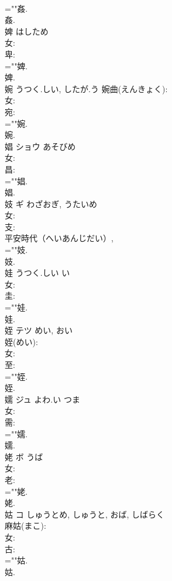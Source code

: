 \documentclass[8pt]{extreport}
\begin{document}
\begin{CJK}{UTF8}{min}
\\	=""姦.
\\	姦.
\\	婢		はしため				
\\	女: 
\\	卑: 
\\	=""婢.
\\	婢.
\\	婉		うつく.しい, したが.う			婉曲(えんきょく): 
\\	女: 
\\	宛: 
\\	=""婉.
\\	婉.
\\	娼	ショウ	あそびめ		
\\	女: 
\\	昌: 
\\	=""娼.
\\	娼.
\\	妓	ギ	わざおぎ, うたいめ		
\\	女: 
\\	支: 
\\	平安時代（へいあんじだい）, 
\\	=""妓.
\\	妓.
\\	娃		うつく.しい	い			
\\	女: 
\\	圭: 
\\	=""娃.
\\	娃.
\\	姪	テツ	めい, おい		
\\	姪(めい): 
\\	女: 
\\	至: 
\\	=""姪.
\\	姪.
\\	嬬	ジュ	よわ.い	つま	
\\	女: 
\\	需: 
\\	=""嬬.
\\	嬬.
\\	姥	ボ	うば		
\\	女: 
\\	老: 
\\	=""姥.
\\	姥.
\\	姑	コ	しゅうとめ, しゅうと, おば, しばらく		
\\	麻姑(まこ): 
\\	女: 
\\	古: 
\\	=""姑.
\\	姑.

\end{CJK}
\end{document}
